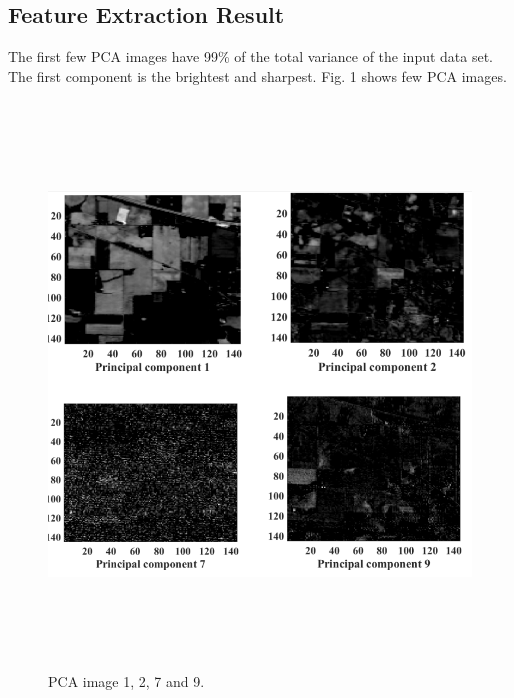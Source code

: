 \documentclass[document.tex]{subfiles}
\begin{document}
\subsection{Feature Extraction Result}
The first few PCA images  have 99\% of the total variance of the input data set. The first component is the brightest and sharpest.
Fig. 1 shows few PCA images. 
\begin{figure}[H]
	\begin{center}
		\includegraphics[height=15.0cm]{imgs/PC.png}
	\end{center}
	\caption{PCA image 1, 2, 7 and 9.}
	\label{fig:Some principal components}
\end{figure}
\end{document}
